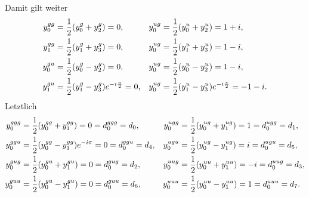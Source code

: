 \documentclass{exercise}
\begin{document}
    Damit gilt weiter
    \begin{align*}
        y_0^{gg} &= \frac{1}{2}\parentheses*{y_0^g + y_2^g} = 0, & y_0^{ug} &= \frac{1}{2}\parentheses*{y_0^u + y_2^u} = 1 + i,\\
        y_1^{gg} &= \frac{1}{2}\parentheses*{y_1^g + y_3^g} = 0, & y_0^{ug} &= \frac{1}{2}\parentheses*{y_1^u + y_3^u} = 1 - i,\\
        y_0^{gu} &= \frac{1}{2}\parentheses*{y_0^g - y_2^g} = 0, & y_0^{ug} &= \frac{1}{2}\parentheses*{y_0^u - y_2^u} = 1 - i,\\
        y_1^{gu} &= \frac{1}{2}\parentheses*{y_1^g - y_3^g}e^{-i\frac{\pi}{2}} = 0, & y_0^{ug} &= \frac{1}{2}\parentheses*{y_1^u - y_3^u}e^{-i\frac{\pi}{2}} = -1 - i.
    \end{align*}
    Letztlich
    \begin{align*}
        y_0^{ggg} &= \frac{1}{2}\parentheses*{y_0^{gg} + y_1^{gg}} = 0 = d_0^{ggg} = d_0, & y_0^{ugg} &= \frac{1}{2}\parentheses*{y_0^{ug} + y_1^{ug}} = 1 = d_0^{ugg} = d_1,\\
        y_0^{ggu} &= \frac{1}{2}\parentheses*{y_0^{gg} - y_1^{gg}}e^{-i\pi} = 0 = d_0^{ggu} = d_4, & y_0^{ugu} &= \frac{1}{2}\parentheses*{y_0^{ug} - y_1^{ug}} = i = d_0^{ugu} = d_5,\\
        y_0^{gug} &= \frac{1}{2}\parentheses*{y_0^{gu} + y_1^{gu}} = 0 = d_0^{gug} = d_2, & y_0^{uug} &= \frac{1}{2}\parentheses*{y_0^{uu} + y_1^{uu}} = -i = d_0^{uug} = d_3,\\
        y_0^{guu} &= \frac{1}{2}\parentheses*{y_0^{gu} - y_1^{gu}} = 0 = d_0^{guu} = d_6, & y_0^{uuu} &= \frac{1}{2}\parentheses*{y_0^{uu} - y_1^{uu}} = 1 = d_0^{uuu} = d_7.
    \end{align*}
\end{document}
